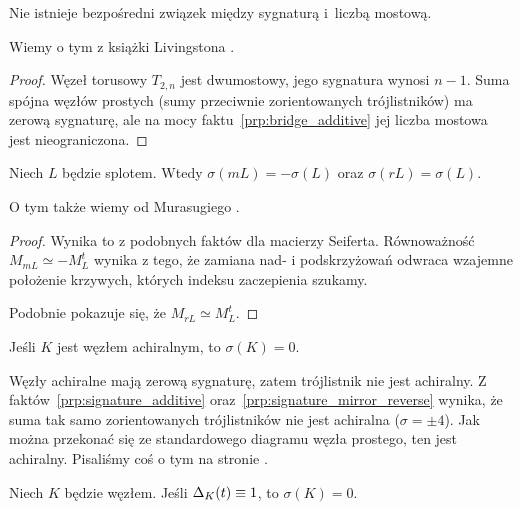 \begin{corollary}
%
\label{no_relation_signature_bridge}%
    Nie istnieje bezpośredni związek między sygnaturą i~liczbą mostową.
\end{corollary}

Wiemy o tym z książki Livingstona \cite[s. 145]{livingston1993}.

\begin{proof}
    Węzeł torusowy $T_{2,n}$ jest dwumostowy, jego sygnatura wynosi $n - 1$.
    Suma spójna węzłów prostych (sumy przeciwnie zorientowanych trójlistników) ma zerową sygnaturę, ale na mocy faktu~\ref{prp:bridge_additive} jej liczba mostowa jest nieograniczona.
\end{proof}

\begin{proposition}
%
%
\label{prp:signature_mirror_reverse}%
    Niech $L$ będzie splotem.
    Wtedy $\sigma(mL) = -\sigma(L)$ oraz $\sigma(rL) = \sigma(L)$.
\end{proposition}

O tym także wiemy od Murasugiego \cite[s. 127]{murasugi1996}.

\begin{proof}
    Wynika to z podobnych faktów dla macierzy Seiferta.
    Równoważność $M_{mL} \simeq - M_L^t$ wynika z tego, że zamiana nad- i podskrzyżowań odwraca wzajemne położenie krzywych, których indeksu zaczepienia szukamy.

    Podobnie pokazuje się, że $M_{rL} \simeq M_L^t$.
\end{proof}

\begin{corollary}
%
\label{cor:acheiral_signature}%
    Jeśli $K$ jest węzłem achiralnym, to $\sigma(K) = 0$.
\end{corollary}

Węzły achiralne mają zerową sygnaturę, zatem trójlistnik nie jest achiralny.
Z faktów~\ref{prp:signature_additive} oraz~\ref{prp:signature_mirror_reverse} wynika, że suma tak samo zorientowanych trójlistników nie jest achiralna ($\sigma = \pm 4$).
Jak można przekonać się ze standardowego diagramu węzła prostego, ten jest achiralny.
Pisaliśmy coś o tym na stronie \pageref{two_sums_of_two_trefoils}.

\begin{proposition}
\label{trivial_alexander_polynomial}%
%
    Niech $K$ będzie węzłem.
    Jeśli $\Delta_K(t) \equiv 1$, to $\sigma (K) = 0$.
\end{proposition}

